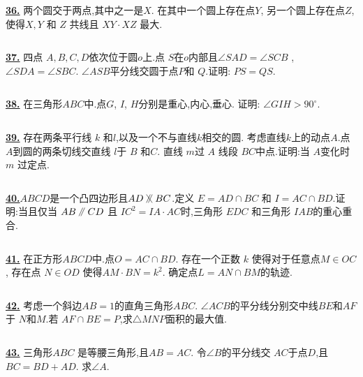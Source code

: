 \documentclass{article}
\newcommand\pxx{%
\mathrel{\text{\tikz[baseline] \draw (0em,-0.3ex) -- (.4em,1.7ex) (.2em,-0.3ex) -- (.6em,1.7ex);}%
}}
\newcommand\notpxx{%
\mathrel{\text{\tikz[baseline] \draw (0em,-0.3ex) -- (.4em,1.7ex) (.2em,-0.3ex) -- (.6em,1.7ex) (0em,1.7ex) -- (.6em,-0.3ex);}%
}}
\begin{document}
$$ $$

\href{http://www.artofproblemsolving.com/Forum/viewtopic.php?p=659219#p659219
 }{\bf 36.} 两个圆交于两点,其中之一是$X.$ 在其中一个圆上存在点$Y$, 另一个圆上存在点$Z$,使得$X, Y$ 和 $Z$ 共线且 $XY \cdot XZ$ 最大.



$$ $$

\href{http://www.artofproblemsolving.com/Forum/viewtopic.php?p=337819#p337819
 }{\bf 37.} 四点 $A, B, C, D$依次位于圆$o$上.点 $S$在$o$内部且$\angle SAD=\angle SCB$ , $\angle SDA= \angle SBC$. $\angle ASB$平分线交圆于点$P$和 $Q$.证明: $PS =QS$.



$$ $$

\href{ http://www.artofproblemsolving.com/Forum/viewtopic.php?p=246214#p246214
}{\bf 38.} 在三角形$ ABC$中.点$ G$, $ I$, $ H$分别是重心,内心,垂心. 证明: $ \angle GIH > 90^{\circ}$.


$$ $$


\href{http://www.artofproblemsolving.com/Forum/viewtopic.php?p=342752#p342752
 }{\bf 39.} 存在两条平行线 $k$ 和$l$,以及一个不与直线$k$相交的圆. 考虑直线$k$上的动点$A$.点$A$到圆的两条切线交直线 $l$于 $B$ 和$C$. 直线 $m$过 $A$ 线段 $BC$中点.证明:当 $A$变化时$m$  过定点.

$$ $$



\href{http://www.artofproblemsolving.com/Forum/viewtopic.php?p=198163#p198163
 }{\bf 40.}$ABCD$是一个凸四边形且$AD\notpxx BC$.定义 $E=AD \cap BC$ 和 $I = AC\cap BD$.证明:当且仅当 $AB \pxx CD$ 且 $IC^{2}= IA \cdot AC$时,三角形 $EDC$ 和三角形 $IAB$的重心重合.


$$ $$


\href{http://www.artofproblemsolving.com/Forum/viewtopic.php?p=578901#p578901
 }{\bf 41.} 在正方形$ABCD$中.点$O = AC\cap BD$. 存在一个正数 $k$ 使得对于任意点$M\in OC$, 存在点 $N\in OD$ 使得$AM\cdot BN=k^{2}$. 确定点$L = AN\cap BM$的轨迹.


$$ $$


\href{ http://www.artofproblemsolving.com/Forum/viewtopic.php?p=447144#p447144
}{\bf 42.} 考虑一个斜边$AB=1$的直角三角形$ABC$. $\angle{ACB}$的平分线分别交中线$BE$和$AF$于 $N$和$M$.若 ${AF}\cap{BE}=P$,求$\triangle{MNP}$面积的最大值.



$$ $$

\href{http://www.artofproblemsolving.com/Forum/viewtopic.php?p=445337#p445337
 }{\bf 43.} 三角形$ABC$ 是等腰三角形,且$AB = AC$. 令$\angle B$的平分线交 $AC$于点$D$,且$BC = BD+AD$.
求$\angle A$.
\end{document}
